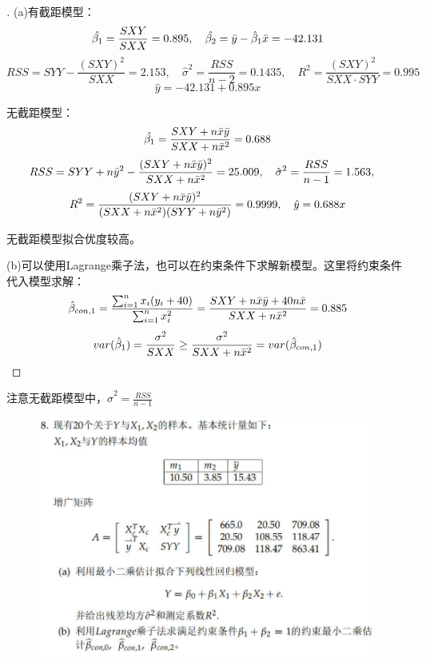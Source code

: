 \documentclass[cn,hazy,green,12pt,normal]{elegantnote}
\numberwithin{equation}{section}
\numberwithin{subsection}{section}
\begin{document}
\begin{proof}[\solutionname]
(a)有截距模型：\[\hat{\beta_1}=\dfrac{SXY}{SXX}=0.895,\quad \hat{\beta_2}=\Bar{y}-\hat{\beta}_1\Bar{x}=-42.131\]
\[RSS = SYY-\dfrac{(SXY)^2}{SXX}=2.153,\quad \hat{\sigma}^2 = \dfrac{RSS}{n-2}=0.1435,\quad R^2 = \dfrac{(SXY)^2}{SXX\cdot SYY}=0.995
\]\[\hat{y}=-42.131+0.895x\]

无截距模型：\[\hat{\beta_1} = \dfrac{SXY+n\Bar{x}\Bar{y}}{SXX+n\Bar{x}^2}=0.688\]
\[RSS = SYY+n\Bar{y}^2-\dfrac{(SXY+n\Bar{x}\Bar{y})^2}{SXX+n\Bar{x}^2}=25.009 ,\quad \hat{\sigma}^2 = \dfrac{RSS}{n-1}=1.563,\quad \]
\[R^2 = \dfrac{(SXY+n\Bar{x}\Bar{y})^2}{(SXX+n\Bar{x}^2)(SYY+n\Bar{y}^2)}=0.9999,\quad \hat{y}=0.688x\]

无截距模型拟合优度较高。

\noindent (b)可以使用Lagrange乘子法，也可以在约束条件下求解新模型。这里将约束条件代入模型求解：
\[\hat{\beta}_{con,1}=\dfrac{\sum_{i=1}^n x_i(y_i+40)}{\sum_{i=1}^{n}x_i^2}=\dfrac{SXY+n\Bar{x}\Bar{y}+40n\Bar{x}}{SXX+n\Bar{x}^2}=0.885\]
\[var(\hat{\beta}_1)=\dfrac{\sigma^2}{SXX}\geq \dfrac{\sigma^2}{SXX+n\Bar{x}^2}=var(\hat{\beta}_{con,1})\]
\end{proof}

\begin{note}
    注意无截距模型中，$\hat{\sigma}^2=\frac{RSS}{n-1}$ %
\end{note}

\newpage
\begin{homework}
\end{homework}
    \begin{figure}[!htbp]
        \centering
        \includegraphics[width=30em]{image/ex2_plt10.png}
    \end{figure}
\end{document}
